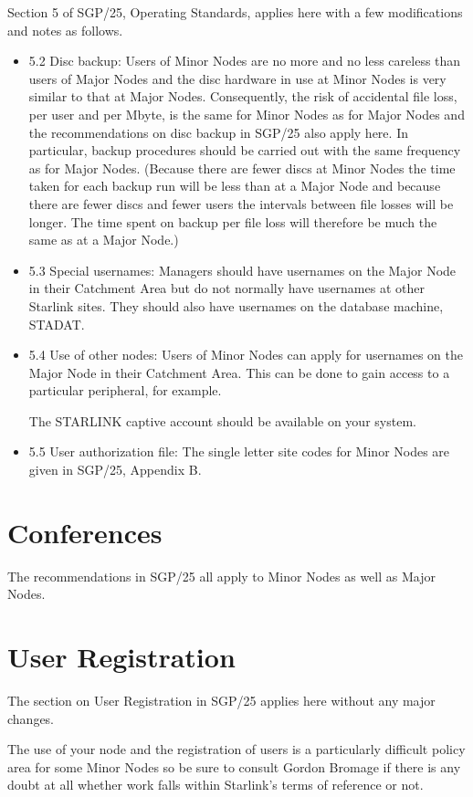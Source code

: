 Section 5 of SGP/25, Operating Standards, applies here with a few modifications
and notes as follows.
\begin{itemize}
\item 5.2 Disc backup: Users of Minor Nodes are no more and no less careless
than users of Major Nodes and the disc hardware in use at Minor Nodes is very
similar to that at Major Nodes.  Consequently, the risk of accidental file
loss, per user and per Mbyte, is the same for Minor Nodes as for
Major Nodes and the recommendations on disc backup in SGP/25 also apply here.
In particular, backup procedures should be carried out with the same frequency
as for Major Nodes.
(Because there are fewer discs at Minor Nodes the time taken for each backup
run will be less than at a Major Node and because there are fewer discs and
fewer users the intervals between file losses will be longer.  The time spent
on backup per file loss will therefore be much the same as at a Major Node.)
\item 5.3 Special usernames: Managers should have usernames on the Major Node in
their Catchment Area but do not normally have usernames at other Starlink sites.
They should also have usernames on the database machine, STADAT.
\item 5.4 Use of other nodes: Users of Minor Nodes can apply for usernames on
the Major Node in their Catchment Area.
This can be done to gain access to a particular peripheral, for example.

The STARLINK captive account should be available on your system.
\item 5.5 User authorization file: The single letter site codes for Minor
Nodes are given in SGP/25, Appendix B.
\end{itemize}

\section {Conferences}

The recommendations in SGP/25 all apply to Minor Nodes as well as Major Nodes.

\section {User Registration}

The section on User Registration in SGP/25 applies here without any major
changes.
 
The use of your node and the registration of users is a particularly difficult
policy area for some Minor Nodes so be sure to consult Gordon Bromage if there
is any doubt at all whether work falls within Starlink's terms of reference
or not.
 
